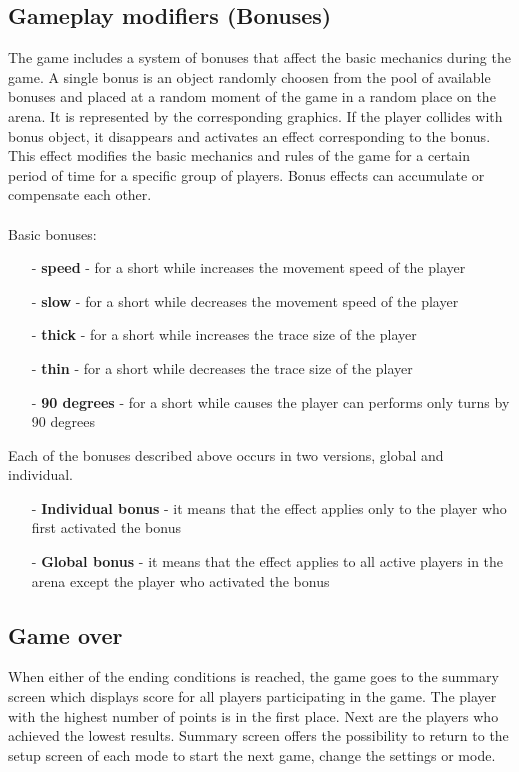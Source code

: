 \subsection{Gameplay modifiers (Bonuses)}
\noindent The game includes a system of bonuses that affect the basic mechanics during the game. A single bonus is an object randomly choosen from the pool of available bonuses and placed at a random moment of the game in a random place on the arena. It is represented by the corresponding graphics. If the player collides with bonus object, it disappears and activates an effect corresponding to the bonus. This effect modifies the basic mechanics and rules of the game for a certain period of time for a specific group of players. Bonus effects can accumulate or compensate each other.
\\
\\
\noindent Basic bonuses:
\begin{itemize}
	\item[-] \textbf{speed} - for a short while increases the movement speed of the player
	\item[-] \textbf{slow} - for a short while decreases the movement speed of the player
	\item[-] \textbf{thick} - for a short while increases the trace size of the player
	\item[-] \textbf{thin} - for a short while decreases the trace size of the player
	\item[-] \textbf{90 degrees} - for a short while causes the player can performs only turns by 90 degrees
\end{itemize}
\noindent Each of the bonuses described above occurs in two versions, global and individual.
\begin{itemize}
	\item[-] \textbf{Individual bonus} - it means that the effect applies only to the player who first activated the bonus
	\item[-] \textbf{Global bonus} - it means that the effect applies to all active players in the arena except the player who activated the bonus
\end{itemize}

\subsection{Game over}
\noindent When either of the ending conditions is reached, the game goes to the summary screen which displays score for all players participating in the game. The player with the highest number of points is in the first place. Next are the players who achieved the lowest results. Summary screen offers the possibility to return to the setup screen of each mode to start the next game, change the settings or mode.